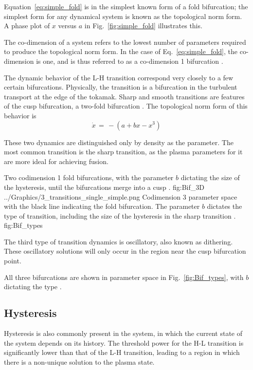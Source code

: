Equation~\ref{eq:simple_fold} is in the simplest known form of a fold bifurcation; the simplest form for any dynamical system is known as the topological norm form.
A phase plot of $x$ versus $a$ in Fig.~\ref{fig:simple_fold} illustrates this.

The co-dimension of a system refers to the lowest number of parameters required to produce the topological norm form.
In the case of Eq.~\ref{eq:simple_fold}, the co-dimension is one, and is thus referred to as a co-dimension 1 bifurcation \cite{weymiens_bifurcation_2014}.

The dynamic behavior of the L-H transition correspond very closely to a few certain bifurcations.
Physically, the transition is a bifurcation in the turbulent transport at the edge of the tokamak.
Sharp and smooth transitions are features of the cusp bifurcation, a two-fold bifurcation \cite{weymiens_bifurcation_2014}. 
The topological norm form of this behavior is
\begin{equation}
	\dot{x} \,=\, -(a + bx - x^3)
	\label{eq:sharp_bif}
\end{equation}

These two dynamics are distinguished only by density as the parameter.
The most common transition is the sharp transition, as the plasma parameters for it are more ideal for achieving fusion.

	{Two codimension 1 fold bifurcations, with the parameter $b$ dictating the size of the hysteresis, until the bifurcations merge into a cusp \cite{weymiens_bifurcation_2014}.}
	{fig:Bif_3D}
	{../Graphics/3_transitions_single_simple.png}
	{Codimension 3 parameter space with the black line indicating the fold bifurcation. The parameter $b$ dictates the type of transition, including the size of the hysteresis in the sharp transition \cite{weymiens_bifurcation_2014}.}
	{fig:Bif_types}

The third type of transition dynamics is oscillatory, also known as dithering.
These oscillatory solutions will only occur in the region near the cusp bifurcation point.

All three bifurcations are shown in parameter space in Fig.~\ref{fig:Bif_types}, with $b$ dictating the type \cite{weymiens_bifurcation_2014}.

\subsection{Hysteresis}
Hysteresis is also commonly present in the system, in which the current state of the system depends on its history.
The threshold power for the H-L transition is significantly lower than that of the L-H transition, leading to a region in which there is a non-unique solution to the plasma state.


